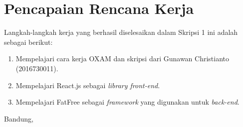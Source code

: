\documentclass[a4paper,twoside]{article}
\begin{document}
\section{Pencapaian Rencana Kerja}
Langkah-langkah kerja yang berhasil diselesaikan dalam Skripsi 1 ini adalah sebagai berikut:
\begin{enumerate}
\item Mempelajari cara kerja OXAM dan skripsi dari Gunawan Christianto (2016730011).
\item Mempelajari React.js sebagai \textit{library front-end}.
\item Mempelajari FatFree sebagai \textit{framework} yang digunakan untuk \textit{back-end}.
\end{enumerate}

\vspace{1cm}
\centering Bandung, \tanggal\\
\vspace{2cm} \nama \\ 
\vspace{1cm}
\end{document}
